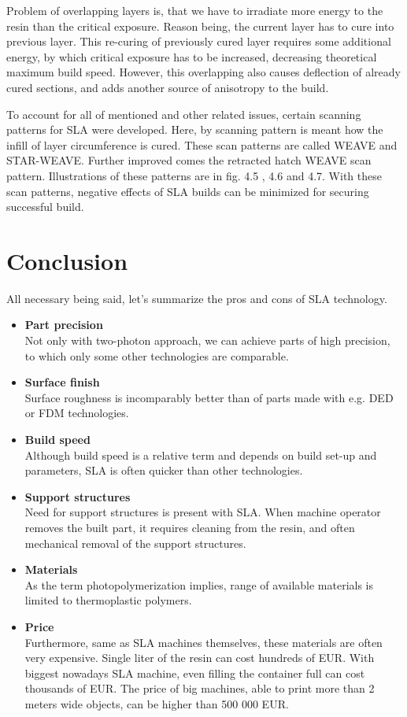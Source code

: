\documentclass[a4paper, 11pt, reqno]{report}
\newcommand\pro{\item[$+$]}
\newcommand\con{\item[$-$]}
\begin{document}
	Problem of overlapping layers is, that we have to irradiate more energy to the resin than the critical exposure. Reason being, the current layer has to cure into previous layer. This re-curing of previously cured layer requires some additional energy, by which critical exposure has to be increased, decreasing theoretical maximum build speed. However, this overlapping also causes deflection of already cured sections, and adds another source of anisotropy to the build.
	
	To account for all of mentioned and other related issues, certain scanning patterns for SLA were developed. Here, by scanning pattern is meant how the infill of layer circumference is cured. These scan patterns are called WEAVE and STAR-WEAVE. Further improved comes the retracted hatch WEAVE scan pattern. Illustrations of these patterns are in fig. 4.5 , 4.6 and 4.7. With these scan patterns, negative effects of SLA builds can be minimized for securing successful build.

%
\section{Conclusion}
All necessary being said, let's summarize the pros and cons of SLA technology.
%
\begin{itemize}
\pro \textbf{Part precision}\\
Not only with two-photon approach, we can achieve parts of high precision, to which only some other technologies are comparable.
\pro \textbf{Surface finish}\\
Surface roughness is incomparably better than of parts made with e.g. DED or FDM technologies.
\pro \textbf{Build speed}\\
Although build speed is a relative term and depends on build set-up and parameters, SLA is often quicker than other technologies.
\\[10pt]
\con \textbf{Support structures}\\
Need for support structures is present with SLA. When machine operator removes the built part, it requires cleaning from the resin, and often mechanical removal of the support structures.
\con \textbf{Materials}\\
As the term photopolymerization implies, range of available materials is limited to thermoplastic polymers.
\con \textbf{Price}\\
Furthermore, same as SLA machines themselves, these materials are often very expensive. Single liter of the resin can cost hundreds of EUR. With biggest nowadays SLA machine, even filling the container full can cost thousands of EUR. The price of big machines, able to print more than 2 meters wide objects, can be higher than 500 000 EUR.
\end{itemize}
\end{document}
